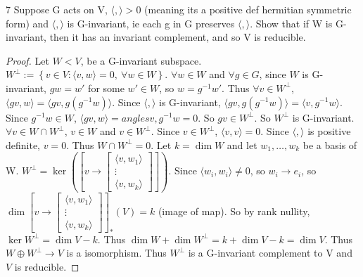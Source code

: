 \documentclass{article}
\newcommand{\angles}[1]{{\langle #1 \rangle}}
\begin{document}
\begin{PROB}{7}\label{Problem 7.}
    Suppose G acts on V, $\angles{ , } > 0$ (meaning its a positive def hermitian symmetric form) and $\angles{ , }$ is G-invariant, ie each g in G preserves $\angles{ , }$. Show that if W is G-invariant, then it has an invariant complement, and so V is reducible. 
\end{PROB}
\begin{proof}
    Let $W < V$, be a G-invariant subspace. $W^\perp := \left\{ v \in V : \angles{v, w} = 0, ~ \forall w \in W \right\}$. $\forall w \in W$ and $\forall g \in G$, since $W$ is G-invariant, $gw = w'$ for some $w' \in W$, so $w = g^{-1}w'$. Thus $\forall v \in W^\perp$,  $\angles{gv, w} = \angles{gv, g (g^{-1}w)}$. Since $\angles{ , }$ is G-invariant, $\angles{gv, g (g^{-1}w)} = \angles{v, g^{-1}w}$. Since $g^{-1}w \in W$, $\angles{gv, w} = angles{v, g^{-1}w} = 0$. So $gv \in W^\perp$. So $W^\perp$ is G-invariant. $\forall v \in W \cap W^\perp$, $v \in W$ and $v \in W^\perp$. Since $v \in W^\perp$, $\angles{v, v} = 0$. Since $\angles{ , }$ is positive definite, $v = 0$. Thus $W \cap W^\perp = 0$. Let $k = \dim W$ and let $w_1, \dots, w_k$ be a basis of W. $W^\perp = \ker\left(\left[v \to \begin{bmatrix}
        \angles{v, w_1} \\
        \vdots \\
        \angles{v, w_k}
    \end{bmatrix}\right]\right)$. Since $\angles{w_i, w_i} \neq 0$, so $w_i \to e_i$, so $\dim \left[v \to \begin{bmatrix}
        \angles{v, w_1} \\
        \vdots \\
        \angles{v, w_k}
    \end{bmatrix}\right]_*(V) = k$ (image of map). So by rank nullity, $\ker W^\perp = \dim V - k$. Thus $\dim W + \dim W^\perp = k + \dim V - k = \dim V$. Thus $W \oplus W^\perp \to V$ is a isomorphism. Thus $W^\perp$ is a G-invariant complement to V and  $V$ is reducible.                   
\end{proof}

\bigskip
\end{document}
